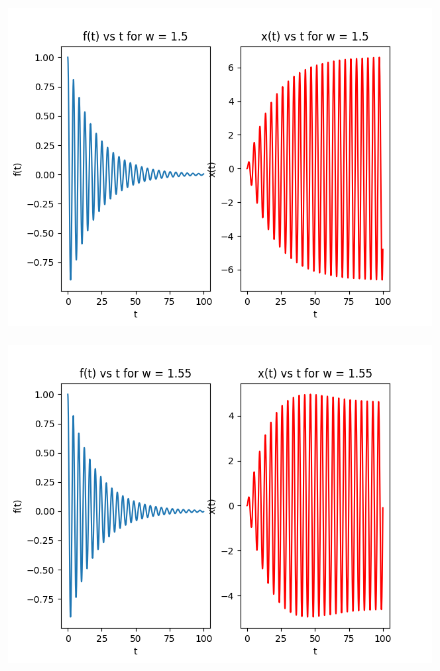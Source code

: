 \documentclass[11pt, a4paper]{article}
\begin{document}
\begin{figure}[H]
     \centering
     \includegraphics[scale=0.8]{Figure_5.png}
\end{figure}

\begin{figure}[H]
     \centering
     \includegraphics[scale=0.8]{Figure_6.png}
\end{figure}
\end{document}
